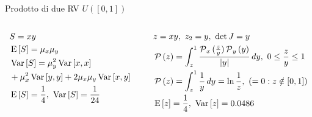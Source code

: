 \documentclass[asd-beamer.tex]{subfiles}
\begin{document}
\begin{wordonframe}{Prodotto di due RV $U([0,1])$}
	\begin{columns}[T]
		\begin{column}{0.5\textwidth}
			\begin{align*}
			&S=xy\\
			&\operatorname{E}{[S]}=\mu_x\mu_y\\
			&\operatorname{Var}{[S]}=\mu_y^2\operatorname{Var}{[x,x]}\\
			&+\mu_x^2\operatorname{Var}{[y,y]}+2\mu_x\mu_y\operatorname{Var}{[x,y]}\\
			&\operatorname{E}{[S]}=\frac{1}{4},\ \operatorname{Var}{[S]}=\frac{1}{24}
			\end{align*}
		\end{column}
		\begin{column}{0.5\textwidth}
			\begin{align*}
			&z=xy,\ z_2=y,\ \det{J}=y\\
			&\prob{(z)}=\int_z^1\frac{\prob_x{(\frac{z}{y})}\prob_y{(y)}}{|y|}\,dy,\ 0\leq\frac{z}{y}\leq1\\
			&\prob{(z)}=\int_z^1\frac{1}{y}\,dy=\ln{\frac{1}{z}},\ (=0: z\notin[0,1])\\
			&\E{[z]}=\frac{1}{4},\ \var{[z]}=\num{0.0486}
			\end{align*}
		\end{column}
	\end{columns}
\end{wordonframe}
\end{document}
